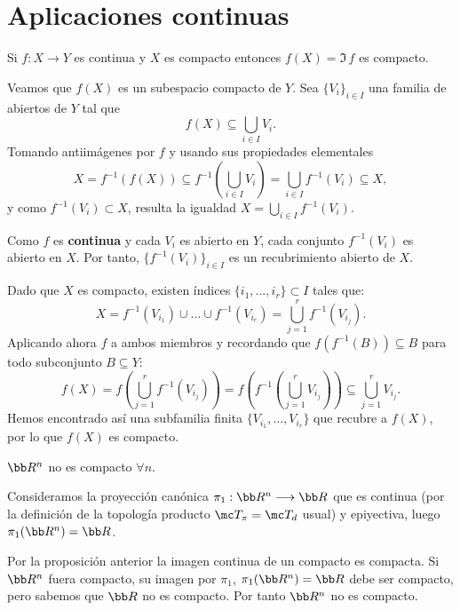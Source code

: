 \section{Aplicaciones continuas}
\begin{prop}
    Si $f: X \longrightarrow Y$ es continua y $X$ es compacto entonces $f(X) = \Im \, f$ es compacto. 
\end{prop}
\begin{dem}
Veamos que $f(X)$ es un subespacio compacto de $Y$. Sea $\{V_i\}_{i \in I}$ una familia de abiertos de $Y$ tal que
\[
    f(X) \subseteq \bigcup_{i \in I} V_i.
\]
Tomando antiimágenes por $f$ y usando sus propiedades elementales
\[
    X = f^{-1}(f(X)) \subseteq f^{-1}\!\left(\bigcup_{i \in I} V_i\right) = \bigcup_{i \in I} f^{-1}(V_i) \subseteq X,
\]
y como $f^{-1}(V_i)\subset X$, resulta la igualdad $\displaystyle X = \bigcup_{i \in I} f^{-1}(V_i)$.

Como $f$ es \textbf{continua} y cada $V_i$ es abierto en $Y$, cada conjunto $f^{-1}(V_i)$ es abierto en $X$. Por tanto, $\{f^{-1}(V_i)\}_{i \in I}$ es un recubrimiento abierto de $X$.

Dado que $X$ es compacto, existen índices $\{i_1, \dots, i_r\} \subset I$ tales que:
\[
    X = f^{-1}(V_{i_1}) \cup \dots \cup f^{-1}(V_{i_r}) = \bigcup_{j=1}^r f^{-1}(V_{i_j}).
\]
Aplicando ahora $f$ a ambos miembros y recordando que $f(f^{-1}(B)) \subseteq B$ para todo subconjunto $B \subseteq Y$:
\[
    f(X) = f\!\left(\bigcup_{j=1}^r f^{-1}(V_{i_j})\right) = f\!\left(f^{-1}\!\left(\bigcup_{j=1}^r V_{i_j}\right)\right) \subseteq \bigcup_{j=1}^r V_{i_j}.
\]
Hemos encontrado así una subfamilia finita $\{V_{i_1}, \dots, V_{i_r}\}$ que recubre a $f(X)$, por lo que $f(X)$ es compacto.
\end{dem}
\begin{ejer}
$\bb R^n$ no es compacto $\forall n$. 
\end{ejer}\begin{dem}
Consideramos la proyecci\'on can\'onica $\pi_1: \bb R^n \longrightarrow \bb R$ que es continua (por la definici\'on de la topolog\'ia producto $\mc T_{\pi} = \mc T_d$ usual) y epiyectiva, luego $\pi_1(\bb R^n) = \bb R$.

Por la proposici\'on anterior la imagen continua de un compacto es compacta. Si $\bb R^n$ fuera compacto, su imagen por $\pi_1$, $\pi_1(\bb R^n) = \bb R$ debe ser compacto, pero sabemos que $\bb R$ no es compacto. Por tanto $\bb R^n$ no es compacto.  
\end{dem}